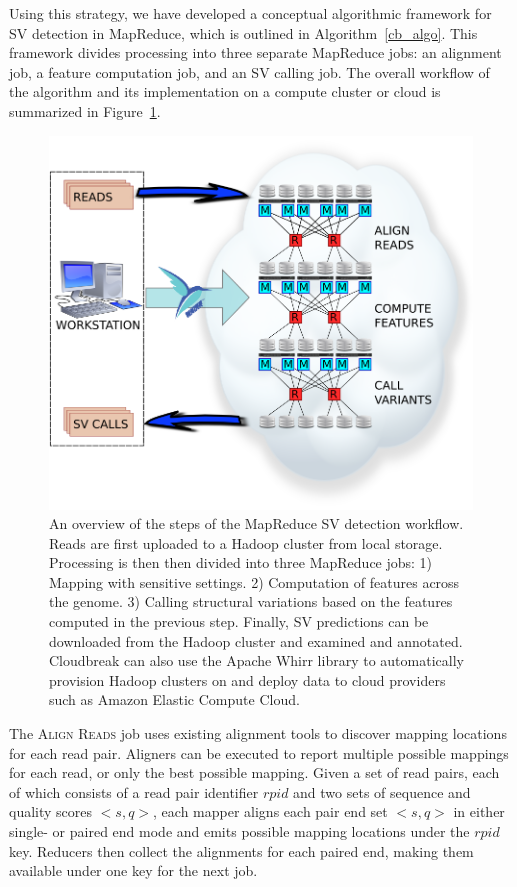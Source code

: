 Using this strategy, we have developed a conceptual algorithmic framework for SV detection in MapReduce, which is outlined in Algorithm~\ref{cb_algo}. This framework divides processing into three separate MapReduce jobs: an alignment job, a feature computation job, and an SV calling job. The overall workflow of the algorithm and its implementation on a compute cluster or cloud is summarized in Figure~\ref{cloudbreak_workflow}.

\begin{figure}
\centering
\includegraphics[width=.8\textwidth]{figures/workflow_with_whirr.png}
\caption{An overview of the steps of the MapReduce SV detection workflow. Reads are first uploaded to a Hadoop cluster from local storage. Processing is then then divided into three MapReduce jobs: 1) Mapping with sensitive settings. 2) Computation of features across the genome. 3) Calling structural variations based on the features computed in the previous step. Finally, SV predictions can be downloaded from the Hadoop cluster and examined and annotated. Cloudbreak can also use the Apache Whirr library to automatically provision Hadoop clusters on and deploy data to cloud providers such as Amazon Elastic Compute Cloud.}
\label{cloudbreak_workflow}
\end{figure}


The \textsc{Align Reads} job uses existing alignment tools to discover mapping locations for each read pair. Aligners can be executed to report multiple possible mappings for each read, or only the best possible mapping. Given a set of read pairs, each of which consists of a read pair identifier $rpid$ and two sets of sequence and quality scores $<s,q>$, each mapper aligns each pair end set $<s,q>$ in either single- or paired end mode and emits possible mapping locations under the $rpid$ key. Reducers then collect the alignments for each paired end, making them available under one key for the next job. 

